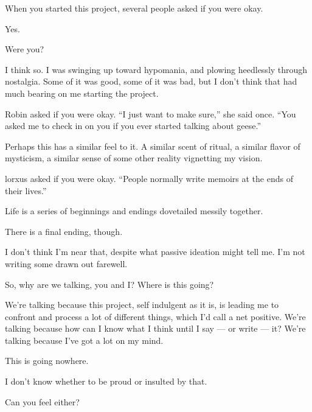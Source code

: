 \label{ally:21}
\begin{paracol}{2}
  \begin{leftcolumn}

\begin{ally}
When you started this project, several people asked if you were okay.
\end{ally}
Yes.

\begin{ally}
Were you?
\end{ally}
I think so. I was swinging up toward hypomania, and plowing heedlessly through nostalgia. Some of it was good, some of it was bad, but I don't think that had much bearing on me starting the project.

\begin{ally}
Robin asked if you were okay. ``I just want to make sure,'' she said once. ``You asked me to check in on you if you ever started talking about geese.''
\end{ally}
Perhaps this has a similar feel to it. A similar scent of ritual, a similar flavor of mysticism, a similar sense of some other reality vignetting my vision.

\begin{ally}
lorxus asked if you were okay. ``People normally write memoirs at the ends of their lives.''
\end{ally}
Life is a series of beginnings and endings dovetailed messily together.

\begin{ally}
There is a final ending, though.
\end{ally}
I don't think I'm near that, despite what passive ideation might tell me. I'm not writing some drawn out farewell.

\begin{ally}
So, why are we talking, you and I? Where is this going?
\end{ally}
We're talking because this project, self indulgent as it is, is leading me to confront and process a lot of different things, which I'd call a net positive. We're talking because how can I know what I think until I say --- or write --- it? We're talking because I've got a lot on my mind.

This is going nowhere.

\begin{ally}
I don't know whether to be proud or insulted by that.
\end{ally}
Can you feel either?


\end{leftcolumn}
\end{paracol}
